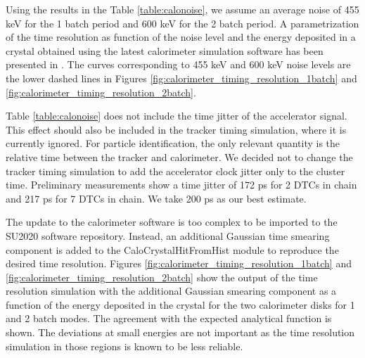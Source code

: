 Using the result{\blue s} in the  {\blue Table \ref{table:calonoise},} we assume an average noise of 455 keV for the 1 batch period
and 600 keV for the 2 batch period. 
A parametrization of the time resolution as function of the noise level and the energy deposited in a crystal obtained using the latest calorimeter 
simulation software has been presented in \cite{MU2E_36225_CALO_TIME_RES}. The curves corresponding to 455 keV and 600 keV {\blue noise levels} are
the lower dashed lines in {\blue F}igures \ref{fig:calorimeter_timing_resolution_1batch} and \ref{fig:calorimeter_timing_resolution_2batch}.

Table \ref{table:calonoise}  {\blue does not} include the time jitter of the accelerator signal. This effect should also be included 
in the tracker timing  simulation{\blue , where it is currently ignored}. For particle identification{\blue ,} the only relevant quantity is 
the relative time between {\blue the} tracker and calorimeter. 
We decided not to change the tracker timing simulation to add the accelerator clock jitter  {\blue only}
to the cluster time.
Preliminary measurements \cite{MU2E_35392_TIME_JITTER} show a time jitter of 172 ps for 2 DTCs in chain and 217 ps for 7 DTCs in chain. 
We take 200 ps as our best  {\blue estimate}.

{\blue The update to the calorimeter software is too complex to be imported to the SU2020 software repository. Instead, an additional Gaussian time smearing
component is added to the CaloCrystalHitFromHist module to reproduce the desired time resolution.}
Figures \ref{fig:calorimeter_timing_resolution_1batch} and \ref{fig:calorimeter_timing_resolution_2batch} show the output of the 
 time resolution simulation {\blue with the additional Gaussian smearing component} as {\blue a} function of the energy deposited in the
crystal for the two calorimeter disks  {\blue for 1 and 2 batch modes.} The agreement with the expected analytical
function is shown. The deviations at small energies are not  {\blue important as} the time resolution simulation in those regions
is known to be less reliable.

